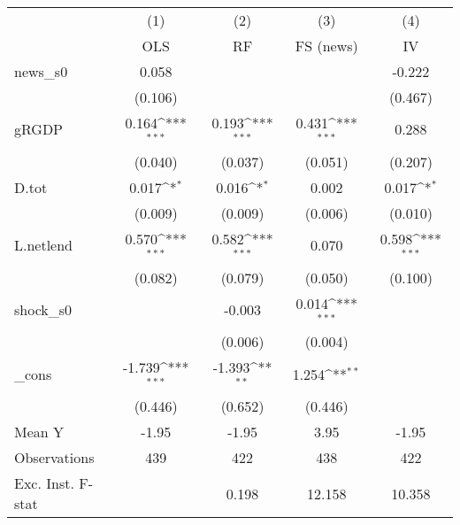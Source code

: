 {
\def\sym#1{\ifmmode^{#1}\else\(^{#1}\)\fi}
\begin{tabular}{l*{4}{c}}
\toprule
            &\multicolumn{1}{c}{(1)}&\multicolumn{1}{c}{(2)}&\multicolumn{1}{c}{(3)}&\multicolumn{1}{c}{(4)}\\
            &\multicolumn{1}{c}{OLS}&\multicolumn{1}{c}{RF}&\multicolumn{1}{c}{FS (news)}&\multicolumn{1}{c}{IV}\\
\midrule
news\_s0     &       0.058         &                     &                     &      -0.222         \\
            &     (0.106)         &                     &                     &     (0.467)         \\
\addlinespace
gRGDP       &       0.164\sym{***}&       0.193\sym{***}&       0.431\sym{***}&       0.288         \\
            &     (0.040)         &     (0.037)         &     (0.051)         &     (0.207)         \\
\addlinespace
D.tot       &       0.017\sym{*}  &       0.016\sym{*}  &       0.002         &       0.017\sym{*}  \\
            &     (0.009)         &     (0.009)         &     (0.006)         &     (0.010)         \\
\addlinespace
L.netlend   &       0.570\sym{***}&       0.582\sym{***}&       0.070         &       0.598\sym{***}\\
            &     (0.082)         &     (0.079)         &     (0.050)         &     (0.100)         \\
\addlinespace
shock\_s0    &                     &      -0.003         &       0.014\sym{***}&                     \\
            &                     &     (0.006)         &     (0.004)         &                     \\
\addlinespace
\_cons      &      -1.739\sym{***}&      -1.393\sym{**} &       1.254\sym{**} &                     \\
            &     (0.446)         &     (0.652)         &     (0.446)         &                     \\
\midrule
Mean Y      &       -1.95         &       -1.95         &        3.95         &       -1.95         \\
Observations&         439         &         422         &         438         &         422         \\
Exc. Inst. F-stat&                     &       0.198         &      12.158         &      10.358         \\
\bottomrule
\end{tabular}
}

